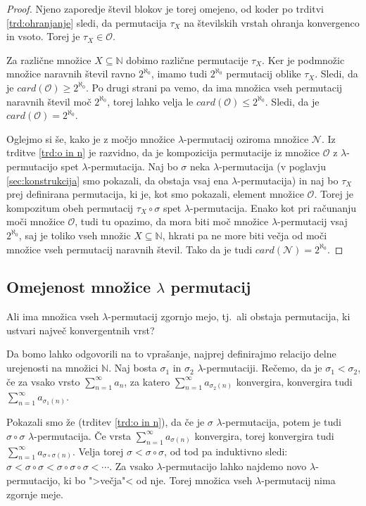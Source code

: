 \documentclass[12pt,a4paper,reqno]{amsart}
\theoremstyle{definition} %
\theoremstyle{plain} %
\newcommand{\N}{\mathbb N}
\begin{document}
\begin{proof}
Njeno zaporedje števil blokov je torej omejeno, od koder po trditvi \ref{trd:ohranjanje} sledi, da permutacija $\tau_X$ na številskih vrstah ohranja konvergenco in vsoto. Torej je $\tau_X \in \mathcal{O}$.

Za različne množice $X \subseteq \N$ dobimo različne permutacije $\tau_X$. Ker je podmnožic množice naravnih števil ravno $2^{\aleph_0}$, imamo tudi $2^{\aleph_0}$ permutacij oblike $\tau_X$. Sledi, da je $card(\mathcal{O})\geq2^{\aleph_0}$. Po drugi strani pa vemo, da ima množica vseh permutacij naravnih števil moč $2^{\aleph_0}$, torej lahko velja le $card(\mathcal{O})\leq2^{\aleph_0}$. Sledi, da je $card(\mathcal{O})=2^{\aleph_0}$.

Oglejmo si še, kako je z močjo množice $\lambda$-permutacij oziroma množice $\mathcal{N}$. Iz trditve \ref{trd:o in n} je razvidno, da je kompozicija permutacije iz množice $\mathcal{O}$ z $\lambda$-permutacijo spet $\lambda$-permutacija. Naj bo $\sigma$ neka $\lambda$-permutacija (v poglavju \ref{sec:konstrukcija} smo pokazali, da obstaja vsaj ena $\lambda$-permutacija) in naj bo $\tau_X$ prej definirana permutacija, ki je, kot smo pokazali, element množice $\mathcal{O}$. Torej je kompozitum obeh permutacij $\tau_X \circ \sigma$ spet $\lambda$-permutacija. Enako kot pri računanju moči množice $\mathcal{O}$, tudi tu opazimo, da mora biti moč množice $\lambda$-permutacij vsaj $2^{\aleph_0}$, saj je toliko vseh množic $X \subseteq \N$, hkrati pa ne more biti večja od moči množice vseh permutacij naravnih števil. Tako da je tudi  $card(\mathcal{N})=2^{\aleph_0}$.
\end{proof}

\subsection{Omejenost množice $\lambda$ permutacij}

Ali ima množica vseh $\lambda$-permutacij zgornjo mejo, tj.\ ali obstaja permutacija, ki ustvari največ konvergentnih vrst?

Da bomo lahko odgovorili na to vprašanje, najprej definirajmo relacijo delne urejenosti na množici $ \mathbb{N}$. Naj bosta $\sigma _1$ in $\sigma _2$ $\lambda$-permutaciji. Rečemo, da je $\sigma_1 < \sigma_2$, če za vsako vrsto $\sum^{\infty}_{n=1}a_n$, za katero $\sum^{\infty}_{n=1}a_{\sigma_2(n)}$ konvergira, konvergira tudi $\sum^{\infty}_{n=1}a_{\sigma_1(n)}$. 

Pokazali smo že (trditev \ref{trd:o in n}), da če je $\sigma$ $\lambda$-permutacija, potem je tudi $\sigma \circ \sigma$  $\lambda$-permutacija. Če vrsta $\sum^{\infty}_{n=1}a_{\sigma(n)}$ konvergira, torej konvergira tudi $\sum^{\infty}_{n=1}a_{\sigma \circ \sigma(n)}$. Velja torej $\sigma < \sigma \circ \sigma$, od tod pa induktivno sledi: $\sigma < \sigma \circ \sigma < \sigma \circ \sigma \circ \sigma < \cdots$. Za vsako $\lambda$-permutacijo lahko najdemo novo $\lambda$-permutacijo, ki bo ">večja"< od nje. Torej množica vseh $\lambda$-permutacij nima zgornje meje. 
\end{document}
